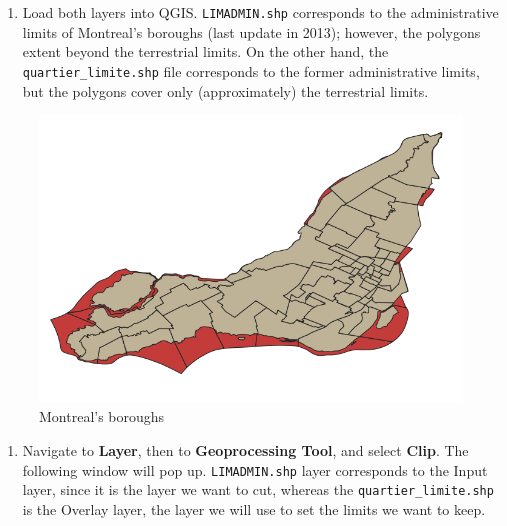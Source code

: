 \documentclass[]{book}
\providecommand{\tightlist}{%
  \setlength{\itemsep}{0pt}\setlength{\parskip}{0pt}}
\theoremstyle{definition}
\theoremstyle{definition}
\theoremstyle{definition}
\theoremstyle{remark}
\begin{document}
\begin{enumerate}
\def\labelenumi{\arabic{enumi}.}
\tightlist
\item
  Load both layers into QGIS. \texttt{LIMADMIN.shp} corresponds to the
  administrative limits of Montreal's boroughs (last update in 2013);
  however, the polygons extent beyond the terrestrial limits. On the
  other hand, the \texttt{quartier\_limite.shp} file corresponds to the
  former administrative limits, but the polygons cover only
  (approximately) the terrestrial limits.
\end{enumerate}

\begin{figure}

{\centering \includegraphics[width=9.72in]{figures/Clipping_Vectors} 

}

\caption{Montreal’s boroughs}\label{fig:unnamed-chunk-19}
\end{figure}

\begin{enumerate}
\def\labelenumi{\arabic{enumi}.}
\setcounter{enumi}{1}
\tightlist
\item
  Navigate to \textbf{Layer}, then to \textbf{Geoprocessing Tool}, and
  select \textbf{Clip}. The following window will pop up.
  \texttt{LIMADMIN.shp} layer corresponds to the Input layer, since it
  is the layer we want to cut, whereas the \texttt{quartier\_limite.shp}
  is the Overlay layer, the layer we will use to set the limits we want
  to keep.
\end{enumerate}
\end{document}
